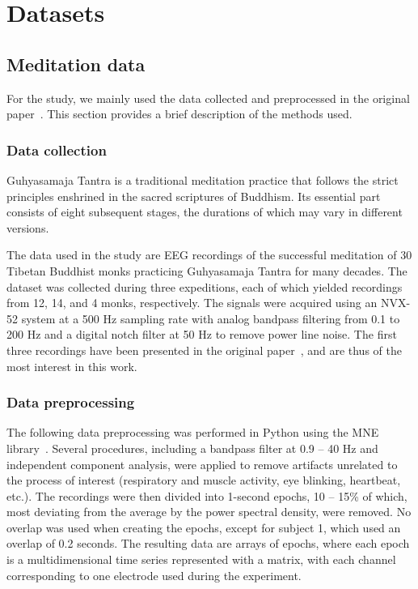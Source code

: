 \documentclass[journal,twoside,web]{ieeecolor2}
\begin{document}
\section{Datasets}

\subsection{Meditation data}

For the study, we mainly used the data collected and preprocessed in the original paper~\cite{SDA}. This section provides a brief description of the methods used.

\subsubsection{Data collection}

Guhyasamaja Tantra is a traditional meditation practice that follows the strict principles enshrined in the sacred scriptures of Buddhism. Its essential part consists of eight subsequent stages, the durations of which may vary in different versions.

The data used in the study are EEG recordings of the successful meditation of 30 Tibetan Buddhist monks practicing Guhyasamaja Tantra for many decades. The dataset was collected during three expeditions, each of which yielded recordings from 12, 14, and 4 monks, respectively. The signals were acquired using an NVX-52 system at a 500 Hz sampling rate with analog bandpass filtering from 0.1 to 200 Hz and a digital notch filter at 50 Hz to remove power line noise. The first three recordings have been presented in the original paper~\cite{SDA}, and are thus of the most interest in this work. 

\subsubsection{Data preprocessing}

The following data preprocessing was performed in Python using the MNE library~\cite{MNE}. Several procedures, including a bandpass filter at 0.9 -- 40 Hz and independent component analysis, were applied to remove artifacts unrelated to the process of interest (respiratory and muscle activity, eye blinking, heartbeat, etc.). The recordings were then divided into 1-second epochs, 10 -- 15\% of which, most deviating from the average by the power spectral density, were removed. No overlap was used when creating the epochs, except for subject 1, which used an overlap of 0.2 seconds. The resulting data are arrays of epochs, where each epoch is a multidimensional time series represented with a matrix, with each channel corresponding to one electrode used during the experiment.
\end{document}
